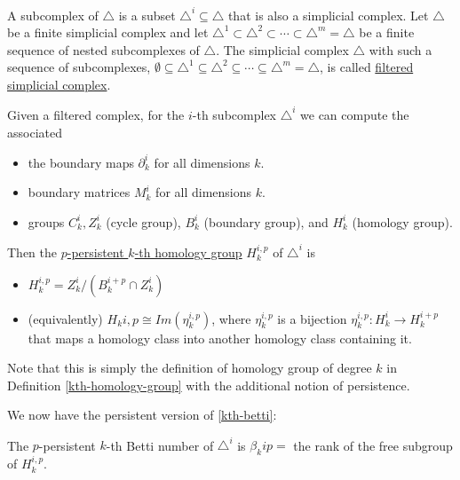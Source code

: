 \begin{defn}
\label{filtered}
A subcomplex of $\triangle$ is a subset $\triangle^i \subseteq \triangle$ that is also a simplicial complex. 
Let $\triangle$ be a finite simplicial complex and let $\triangle^1 \subset \triangle^2 \subset \cdots \subset \triangle^m = \triangle$ be a finite sequence of nested subcomplexes of $\triangle$. The simplicial complex $\triangle$ with such a sequence of subcomplexes, $\emptyset \subseteq \triangle^1 \subseteq \triangle^2 \subseteq \cdots \subseteq \triangle^m = \triangle$, is called \underline{filtered simplicial complex}.

\end{defn}

\begin{defn}
Given a filtered complex, for the $i$-th subcomplex $\triangle^i$ we can compute the associated 
\begin{itemize}
    \item the boundary maps $\partial_k^i$ for all dimensions $k$.
    \item boundary matrices $M_k^i$ for all dimensions $k$.
    \item groups $C_k^i, Z_k^i$ (cycle group), $B_k^i$ (boundary group), and $H_k^i$ (homology group).
\end{itemize}
Then the \underline{$p$-persistent $k$-th homology group} $H_k^{i,p}$ of $\triangle^i$ is 
\begin{itemize}
    \item $H_k^{i,p} = Z_k^i / (B_k^{i+p}\cap Z_k^i)$
    \item (equivalently) $H_k{i,p} \cong Im(\eta_k^{i,p})$, where $\eta_k^{i,p}$ is a bijection $\eta_k^{i,p}: H_k^i \to H_k^{i+p}$ that maps a homology class into another homology class containing it.   
\end{itemize}
Note that this is simply the definition of homology group of degree $k$ in Definition \ref{kth-homology-group} with the additional notion of persistence.
\end{defn}

\begin{defn}
We now have the persistent version of \ref{kth-betti}:

The $p$-persistent $k$-th Betti number of $\triangle^i$ is $\beta_k{i p} = $ the rank of the free subgroup of $H_k^{i,p}$.
\end{defn}


